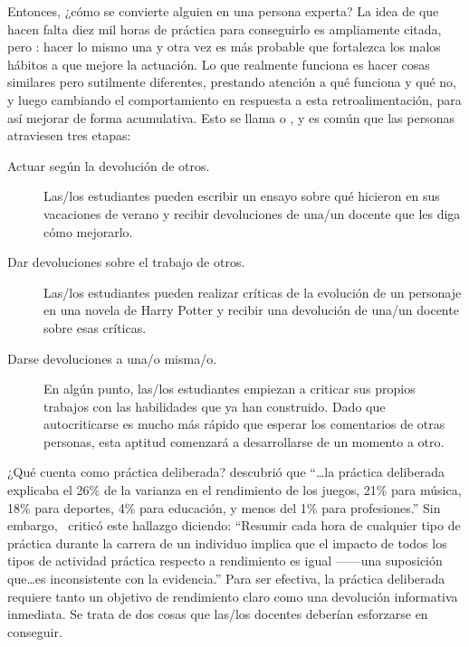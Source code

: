 
Entonces, ¿cómo se convierte alguien en una persona experta?
La idea de que hacen falta diez mil horas de práctica para conseguirlo es ampliamente citada,
pero :
hacer lo mismo una y otra vez es más probable que fortalezca los malos hábitos a que mejore la actuación.
Lo que realmente funciona es hacer cosas similares pero sutilmente diferentes,
prestando atención a qué funciona y qué no,
y luego cambiando el comportamiento en respuesta a esta retroalimentación, para así mejorar de forma acumulativa.
Esto se llama 
o ,
y es común que las personas atraviesen tres etapas:

\begin{description}

\item[Actuar según la devolución de otros.]
  Las/los estudiantes pueden escribir un ensayo sobre qué hicieron en sus vacaciones de verano
  y recibir devoluciones de una/un docente que les diga cómo mejorarlo.

\item[Dar devoluciones sobre el trabajo de otros.]
  Las/los estudiantes pueden realizar críticas de la evolución de un personaje en una novela de Harry Potter
  y recibir una devolución de una/un docente sobre esas críticas.

\item[Darse devoluciones a una/o misma/o.]
  En algún punto,
  las/los estudiantes empiezan a criticar sus propios trabajos
  con las habilidades que ya han construido.
  Dado que auto\-criticarse es mucho más rápido que esperar los comentarios de otras personas, 
  esta aptitud comenzará a desarrollarse de un momento a otro.
  
\end{description}

\begin{aside}{¿Qué cuenta como práctica deliberada?}
  \cite{Macn2014} descubrió que
  ``{\ldots}la práctica deliberada explicaba el 26\% de la varianza en el rendimiento de los juegos,
  21\% para música,
  18\% para deportes,
  4\% para educación,
  y menos del 1\% para profesiones.''
  Sin embargo,~\cite{Eric2016} criticó este hallazgo diciendo:
  ``Resumir cada hora de cualquier tipo de práctica durante la carrera de un individuo
 implica que el impacto de todos los tipos de actividad práctica respecto a rendimiento es igual ------una suposición
  que{\ldots}es inconsistente con la evidencia.''
  Para ser efectiva,
  la práctica deliberada requiere tanto un objetivo de rendimiento claro
  como una devolución informativa inmediata.
  Se trata de dos cosas que las/los docentes deberían esforzarse en conseguir.
\end{aside}

